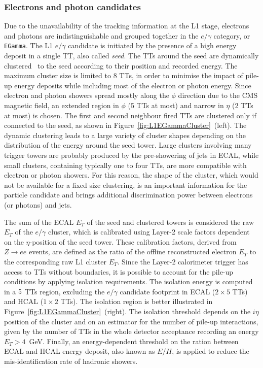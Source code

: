 \subsubsection{Electrons and photon candidates}

Due to the unavailability of the tracking information at the L1 stage, electrons and photons are indistinguishable and grouped together in the $e/\gamma$ category, or \texttt{EGamma}.
The L1 $e/\gamma$ candidate is initiated by the presence of a high energy deposit in a single TT, also called \textit{seed}. The TTs around the seed are dynamically clustered~\cite{Sauvan_2015} to the seed according to their position and recorded energy.
The maximum cluster size is limited to 8 TTs, in order to minimise the impact of pile-up energy deposits while including most of the electron or photon energy.
Since electron and photon showers spread mostly along the $\phi$ direction due to the CMS magnetic field, an extended region in $\phi$ (5 TTs at most) and narrow in $\eta$ (2 TTs at most) is chosen.
The first and second neighbour fired TTs are clustered only if connected to the seed, as shown in Figure~\ref{fig:L1EGammaCluster}~(left).
The dynamic clustering leads to a large variety of cluster shapes depending on the distribution of the energy around the seed tower. Large clusters involving many trigger towers are probably produced by the pre-showering of jets in ECAL, while small clusters, containing typically one to four TTs, are more compatible with electron or photon showers. For this reason, the shape of the cluster, which would not be available for a fixed size clustering, is an important information for the particle candidate and brings additional discrimination power between electrons (or photons) and jets.

The sum of the ECAL $E_T$ of the seed and clustered towers is considered the raw $E_T$ of the $e/\gamma$ cluster, which is calibrated using Layer-2 scale factors dependent on the $\eta$-position of the seed tower. These calibration factors, derived from $Z \rightarrow ee$ events, are defined as the ratio of the offline reconstructed electron $E_T$ to the corresponding raw L1 cluster $E_T$.
Since the Layer-2 calorimeter trigger has access to TTs without boundaries, it is possible to account for the pile-up conditions by applying isolation requirements. The isolation energy is computed in a $5\time9$ TTs region, excluding the $e/\gamma$ candidate footprint in ECAL ($2\times5$ TTs) and HCAL ($1\times2$ TTs). The isolation region is better illustrated in Figure~\ref{fig:L1EGammaCluster}~(right). The isolation threshold depends on the $i\eta$ position of the cluster and on an estimator for the number of pile-up interactions, given by the number of TTs in the whole detector acceptance recording an energy $E_T>4$~GeV. 
Finally, an energy-dependent threshold on the ration between ECAL and HCAL energy deposit, also known as $E/H$, is applied to reduce the mis-identification rate of hadronic showers.

